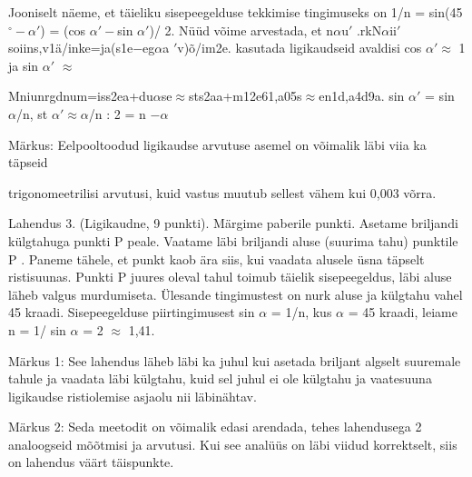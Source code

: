 Jooniselt näeme, et täieliku sisepeegelduse tekkimise tingimuseks on 1/n = sin(45$^\circ- \alpha'$) = (cos $\alpha'-$sin $\alpha'$)/ 2. Nüüd võime arvestada, et n$\alpha$u$'$ .rkN$\alpha$ii$'$soiins,v1ä/inke=ja(s1e$-$eg$\alpha$a $'$v)õ/im2e. kasutada ligikaudseid avaldisi cos $\alpha' \approx$ 1 ja sin $\alpha'$ $\approx$

Mniunrgdnum=iss2ea+du$\alpha$se$\approx$sts2aa+m12e61,a05s$\approx$en1d,a4d9a. sin $\alpha'$ = sin $\alpha$/n, st $\alpha' \approx \alpha$/n : 2 = n $- \alpha$

Märkus: Eelpooltoodud ligikaudse arvutuse asemel on võimalik läbi viia ka täpseid

trigonomeetrilisi arvutusi, kuid vastus muutub sellest vähem kui 0,003 võrra.

Lahendus 3. (Ligikaudne, 9 punkti). Märgime paberile punkti. Asetame briljandi külgtahuga punkti P peale. Vaatame läbi briljandi aluse (suurima tahu) punktile P . Paneme tähele, et punkt kaob ära siis, kui vaadata alusele üsna täpselt ristisuunas. Punkti P juures oleval tahul toimub täielik sisepeegeldus, läbi aluse läheb valgus murdumiseta. Ülesande tingimustest on nurk aluse ja külgtahu vahel 45 kraadi. Sisepeegelduse piirtingimusest sin $\alpha$ = 1/n, kus $\alpha$ = 45 kraadi, leiame n = 1/ sin $\alpha$ = 2 $\approx$ 1,41.

Märkus 1: See lahendus läheb läbi ka juhul kui asetada briljant algselt suuremale tahule ja vaadata läbi külgtahu, kuid sel juhul ei ole külgtahu ja vaatesuuna ligikaudse ristiolemise asjaolu nii läbinähtav.

Märkus 2: Seda meetodit on võimalik edasi arendada, tehes lahendusega 2 analoogseid mõõtmisi ja arvutusi. Kui see analüüs on läbi viidud korrektselt, siis on lahendus väärt täispunkte.
\probend
